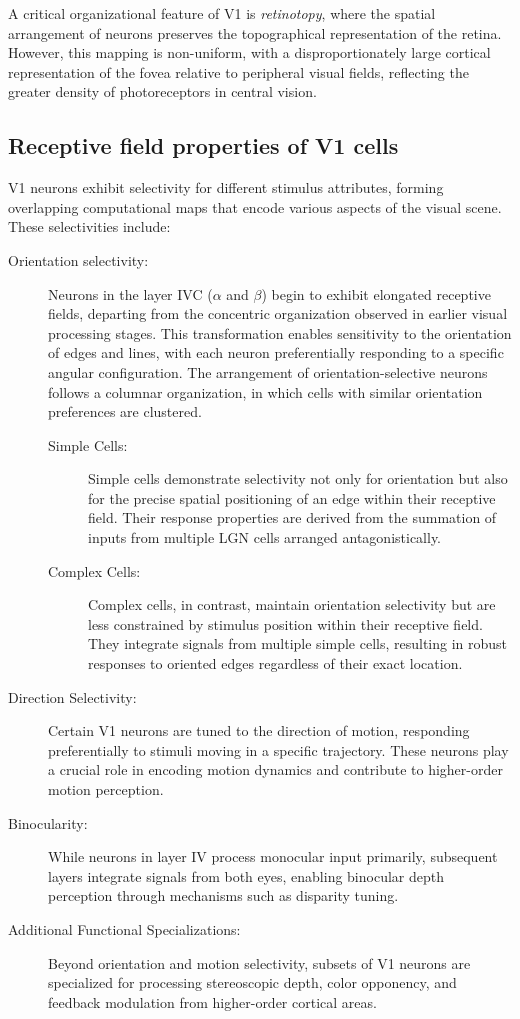 A critical organizational feature of V1 is \emph{retinotopy}, where the spatial
arrangement of neurons preserves the topographical representation of the retina. 
However, this mapping is non-uniform, with a disproportionately large cortical
representation of the fovea relative to peripheral visual fields, reflecting the
greater density of photoreceptors in central vision.

\subsection{Receptive field properties of V1 cells}
\label{subsec:receptive_field}
V1 neurons exhibit selectivity for different stimulus attributes, forming
overlapping computational maps that encode various aspects of the visual scene. 
These selectivities include:

\begin{description}
    \item[Orientation selectivity:] Neurons in the layer IVC ($\alpha$ and $\beta$) begin to exhibit elongated receptive fields, departing from the concentric organization observed in earlier visual processing stages. This transformation enables sensitivity to the orientation of edges and lines, with each neuron preferentially responding to a specific angular configuration. The arrangement of orientation-selective neurons follows a columnar organization, in which cells with similar orientation preferences are clustered.
    \begin{description}
        \item[Simple Cells:] Simple cells demonstrate selectivity not only for orientation 
        but also for the precise spatial positioning of an edge within their receptive field. 
        Their response properties are derived from the summation of inputs from multiple LGN cells arranged antagonistically.
        \item[Complex Cells:] Complex cells, in contrast, maintain orientation selectivity but are less constrained by stimulus position within their receptive field. They 
        integrate signals from multiple simple cells, resulting in robust responses to oriented edges regardless of their exact location.
    \end{description}
    \item[Direction Selectivity:] Certain V1 neurons are tuned to the direction of motion, 
    responding preferentially to stimuli moving in a specific trajectory. These neurons play a crucial role in encoding motion dynamics and contribute to higher-order motion perception.
    \item[Binocularity:] While neurons in layer IV process monocular input primarily, subsequent layers integrate signals from both eyes, enabling binocular depth perception through mechanisms such as disparity tuning.
    \item[Additional Functional Specializations:] Beyond orientation and motion selectivity, 
    subsets of V1 neurons are specialized for processing stereoscopic depth, color opponency, 
    and feedback modulation from higher-order cortical areas.
\end{description}

